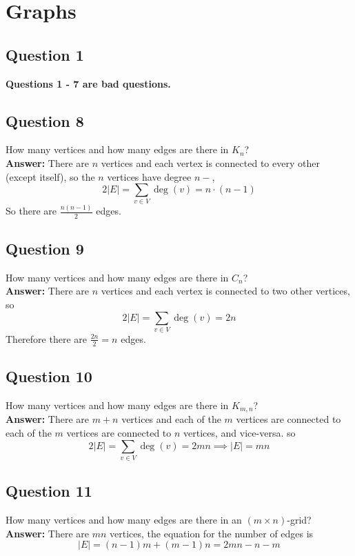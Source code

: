 \documentclass[openany]{report}
\begin{document}
\chapter{}
\chapter{Graphs}
\section{Question 1}
\begin{center}
    \textbf{Questions 1 - 7 are bad questions.}
\end{center}
\setcounter{section}{7}
\section{Question 8}
How many vertices and how many edges are there in $K_n$? \\[2ex]
\textbf{Answer:} There are $n$ vertices and each vertex is connected to every other (except itself), so the $n$ vertices have degree $n-$, 
\[2|E| = \sum_{v \in V} \deg(v) = n \cdot (n - 1)\]
So there are $\frac{n(n-1)}{2}$ edges.
\section{Question 9}
How many vertices and how many edges are there in $C_n$? \\[2ex]
\textbf{Answer:} There are $n$ vertices and each vertex is connected to two other vertices, so
\[2|E| = \sum_{v \in V} \deg(v) = 2n\]
Therefore there are $\frac{2n}{2} = n$ edges.
\section{Question 10}
How many vertices and how many edges are there in $K_{m,n}$? \\[2ex]
\textbf{Answer:} There are $m + n$ vertices and each of the $m$ vertices are connected to each of the $m$ vertices are connected to $n$ vertices, and vice-versa. so 
\[2|E| = \sum_{v \in V} \deg(v) = 2mn \implies |E| = mn\]
\section{Question 11} 
How many vertices and how many edges are there in an $(m \times n)$-grid?\\[2ex]
\textbf{Answer:} There are $mn$ vertices, the equation for the number of edges is 
\[|E| = (n-1)m + (m-1)n = 2mn - n - m\]
\end{document}
